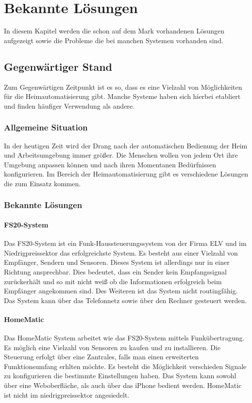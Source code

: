 \chapter{Bekannte Lösungen}
In diesem Kapitel werden die schon auf dem Mark vorhandenen Lösungen aufgezeigt sowie die Probleme die bei manchen Systemen vorhanden sind.

\section{Gegenwärtiger Stand}
Zum Gegenwärtigen Zeitpunkt ist es so, dass es eine Vielzahl von Möglichkeiten für die Heimautomatisierung gibt. 
Manche Systeme haben sich hierbei etabliert und finden häufiger Verwendung als andere. 

\subsection{Allgemeine Situation}
In der heutigen Zeit wird der Drang nach der automatischen Bedienung der Heim und Arbeitsumgebung immer größer. Die Menschen wollen von jedem Ort 
ihre Umgebung anpassen können und nach ihren Momentanen Bedürfnissen konfigurieren. Im Bereich der Heimautomatisierung gibt es verschiedene Lösungen die zum 
Einsatz kommen. 
\subsection{Bekannte Lösungen}
\subsubsection{FS20-System}
Das FS20-System ist ein Funk-Haussteuerungssystem von der Firma ELV und im Niedrigpreissektor das erfolgreichste System. Es besteht aus einer Vielzahl
von Empfänger, Sendern und Sensoren. Dieses System ist allerdings nur in einer Richtung ansprechbar. Dies bedeutet, dass ein Sender kein Empfangssignal zurückerhält 
und so mit nicht weiß ob die Informationen erfolgreich beim Empfänger angekommen sind. Des Weiteren ist das System nicht routingfähig. Das System kann über das Telefonnetz
sowie über den Rechner gesteuert werden.

\subsubsection{HomeMatic}
Das HomeMatic System arbeitet wie das FS20-System mittels Funkübertragung. Es möglich eine Vielzahl von Sensoren zu kaufen und zu installieren. Die Steuerung erfolgt über eine 
Zantrales, falls man einen erweiterten Fumktionsumfang erhlten möchte. Es besteht die Möglichkeit verschieden Signale zu konfigurieren die bestimmte Einstellungen haben. 
Das System kann sowohl über eine Weboberfläche, als auch über das iPhone bedient werden. HomeMatic ist nicht im niedrigpreissektor angesiedelt.

